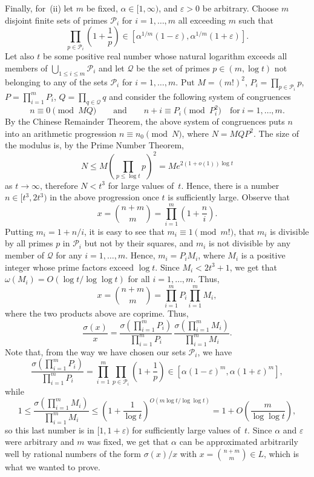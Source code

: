 \documentclass[twoside,amsthm]{elsart}
\def\cP{\mathcal{P}}
\def\cQ{\mathcal{Q}}
\begin{document}
Finally, for~(ii) let $m$ be fixed, $\alpha\in [1,\infty)$, and
$\varepsilon>0$ be arbitrary. Choose $m$ disjoint finite sets of
primes $\cP_i$ for $i=1,\ldots,m$ all exceeding $m$ such
that
$$
\prod_{p\in \cP_i}\left(1+\frac{1}{p}\right)\in
[\alpha^{1/m}(1-\varepsilon),\alpha^{1/m}(1+\varepsilon)].
$$
Let also $t$ be some positive real number whose natural logarithm
exceeds all members of $\bigcup_{1\le i\le m} \cP_i$ and
let $\cQ$ be the set of primes $p\in (m,\log t)$ not
belonging to any of the sets $\cP_i$ for $i=1,\ldots,m$.
Put $M=(m!)^2$, $P_i=\prod_{p\in \cP_i} p$,
$P=\prod_{i=1}^m P_i$, $Q=\prod_{q\in \cQ} q$ and consider
the following system of congruences
$$
n\equiv 0\pmod {MQ}\qquad \text{and}\qquad n+i\equiv P_i\pmod
{P_i^2} \quad \text{for}~i=1,\ldots,m.
$$
By the Chinese Remainder Theorem, the above system of congruences
puts $n$ into an arithmetic progression $n\equiv n_0\pmod {N}$,
where $N=MQP^2$. The size of the modulus is, by the Prime Number
Theorem,
$$
N\le M\left(\prod_{p\le \log t} p\right)^2=Me^{2(1+o(1))\log t}
$$
as $t\to\infty$, therefore $N<t^3$ for large values of~$t$. Hence,
there is a number $n\in [t^3,2t^3)$ in the above progression once
$t$ is sufficiently large. Observe that
$$
x=\binom{n+m}{m}=\prod_{i=1}^m\left(1+\frac{n}{i}\right).
$$
Putting $m_i=1+n/i$, it is easy to see that $m_i\equiv 1\pmod {m!}$,
that $m_i$ is divisible by all primes $p$ in $\cP_i$ but
not by their squares, and $m_i$ is not divisible by any member of
$\cQ$ for any $i=1,\ldots,m$. Hence, $m_i=P_iM_i$, where
$M_i$ is a positive integer whose prime factors exceed $\log t$.
Since $M_i<2t^3+1$, we get that $\omega(M_i)=O(\log t/\log\log t)$
for all $i=1,\ldots,m$. Thus,
$$
x=\binom{n+m}{m} = \prod_{i=1}^m P_i\prod_{i=1}^m M_i,
$$
where the two products above are coprime. Thus,
$$
\frac{\sigma(x)}{x} 
= \frac{\sigma\left(\prod_{i=1}^m P_i\right)}{\prod_{i=1}^m P_i}
\, \frac{\sigma\left(\prod_{i=1}^m M_i\right)}{\prod_{i=1}^m M_i}.
$$
Note that, from the way we have chosen our sets $\cP_i$, we
have
$$
\frac{\sigma\left(\prod_{i=1}^m P_i\right)}{\prod_{i=1}^m P_i}
= \prod_{i=1}^m \prod_{p\in \cP_i}
\left(1+\frac{1}{p}\right) \in
[\alpha(1-\varepsilon)^m,\alpha(1+\varepsilon)^m],
$$
while
$$
1\le \frac{\sigma\left(\prod_{i=1}^m M_i\right)}{\prod_{i=1}^m M_i}
\le \left(1+\frac{1}{\log t}\right)^{O(m\log t/\log\log t)}
= 1+O\left(\frac{m}{\log\log t}\right),
$$
so this last number is in $[1,1+\varepsilon)$ for sufficiently large
values of~$t$. Since $\alpha$ and $\varepsilon$ were arbitrary and
$m$ was fixed, we get that $\alpha$ can be approximated arbitrarily
well by rational numbers of the form $\sigma(x)/x$ with
$x=\binom{n+m}{m}\in L$, which is what we wanted to prove.
\end{document}
